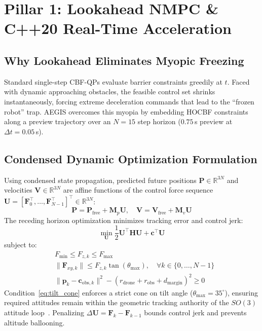 \documentclass[journal,10pt]{IEEEtran}
\begin{document}
\section{Pillar 1: Lookahead NMPC \& C++20 Real-Time Acceleration}
\label{sec:pillar1_nmpc}

\subsection{Why Lookahead Eliminates Myopic Freezing}
Standard single-step CBF-QPs evaluate barrier constraints greedily at $t$. Faced with dynamic approaching obstacles, the feasible control set shrinks instantaneously, forcing extreme deceleration commands that lead to the ``frozen robot'' trap. AEGIS overcomes this myopia by embedding HOCBF constraints along a preview trajectory over an $N=15$ step horizon ($0.75\,$s preview at $\Delta t = 0.05\,$s).

\subsection{Condensed Dynamic Optimization Formulation}
Using condensed state propagation, predicted future positions $\mathbf{P} \in \mathbb{R}^{3N}$ and velocities $\mathbf{V} \in \mathbb{R}^{3N}$ are affine functions of the control force sequence $\mathbf{U} = [\mathbf{F}_0^\top, \dots, \mathbf{F}_{N-1}^\top]^\top \in \mathbb{R}^{3N}$:
\begin{equation}
\mathbf{P} = \mathbf{P}_{\text{free}} + \mathbf{M}_p \mathbf{U}, \quad \mathbf{V} = \mathbf{V}_{\text{free}} + \mathbf{M}_v \mathbf{U}
\end{equation}
The receding horizon optimization minimizes tracking error and control jerk:
\begin{equation}
\min_{\mathbf{U}} \frac{1}{2}\mathbf{U}^\top \mathbf{H} \mathbf{U} + \mathbf{c}^\top \mathbf{U}
\end{equation}
subject to:
\begin{align}
& F_{\text{min}} \le F_{z, k} \le F_{\text{max}} \\
& \|\mathbf{F}_{xy, k}\| \le F_{z, k} \tan(\theta_{\text{max}}), \quad \forall k \in \{0, \dots, N-1\} \label{eq:tilt_cone} \\
& \|\mathbf{p}_k - \mathbf{c}_{\text{obs}, k}\|^2 - (r_{\text{drone}} + r_{\text{obs}} + d_{\text{margin}})^2 \ge 0 \label{eq:nmpc_cbf}
\end{align}
Condition~\eqref{eq:tilt_cone} enforces a strict cone on tilt angle ($\theta_{\text{max}} = 35^\circ$), ensuring required attitudes remain within the geometric tracking authority of the $SO(3)$ attitude loop~\cite{lee2010geometric}. Penalizing $\Delta \mathbf{U} = \mathbf{F}_k - \mathbf{F}_{k-1}$ bounds control jerk and prevents altitude ballooning.
\end{document}
